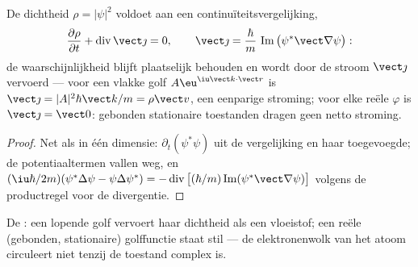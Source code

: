 \begin{proposition}\label{prop:b3:schrodinger-three-dimensions:current}
De dichtheid $\rho = |\psi|^2$ voldoet aan een continuïteitsvergelijking,
\[
\frac{\partial\rho}{\partial t} + \operatorname{div}\vect\jmath = 0 ,
\qquad
\vect\jmath = \frac{\hbar}{m}\,
\operatorname{Im}\big(\psi^*\vect\nabla\psi\big) :
\]
de waarschijnlijkheid blijft plaatselijk behouden en wordt door de stroom
$\vect\jmath$ vervoerd --- voor een vlakke golf $A\eu^{\iu\vect k\cdot\vect r}$ is $\vect\jmath = |A|^2\hbar\vect k/m = \rho\vect v$, een
eenparige stroming; voor elke reële $\varphi$ is $\vect\jmath = \vect 0$:
gebonden stationaire toestanden dragen geen netto stroming.
\end{proposition}

\begin{proof}
Net als in één dimensie: $\partial_t(\psi^*\psi)$ uit de vergelijking en
haar toegevoegde; de potentiaaltermen vallen weg, en $(\iu\hbar/2m)
(\psi^*\Delta\psi - \psi\Delta\psi^*) =
-\operatorname{div}\big[(\hbar/m)\operatorname{Im}(\psi^*\vect\nabla
\psi)\big]$ volgens de productregel voor de divergentie.
\end{proof}

\begin{omfigure}

{\small De : een lopende golf vervoert haar
dichtheid als een vloeistof; een reële (gebonden, stationaire)
golffunctie staat stil --- de elektronenwolk van het atoom circuleert
niet tenzij de toestand complex is.}
\end{omfigure}

